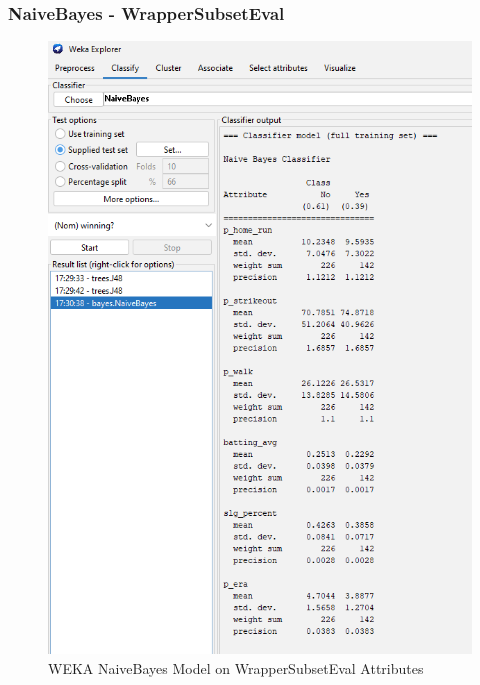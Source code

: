\documentclass[12pt]{article}
\begin{document}
\newpage
\subsubsection{NaiveBayes - WrapperSubsetEval}
\begin{figure}[h!]
    \includegraphics[scale=0.4]{./images/WrapperSubsetEval/NaiveBayes-Model.png}
\centering
    \caption{WEKA NaiveBayes Model on WrapperSubsetEval Attributes}
\end{figure}
\newpage
\end{document}
